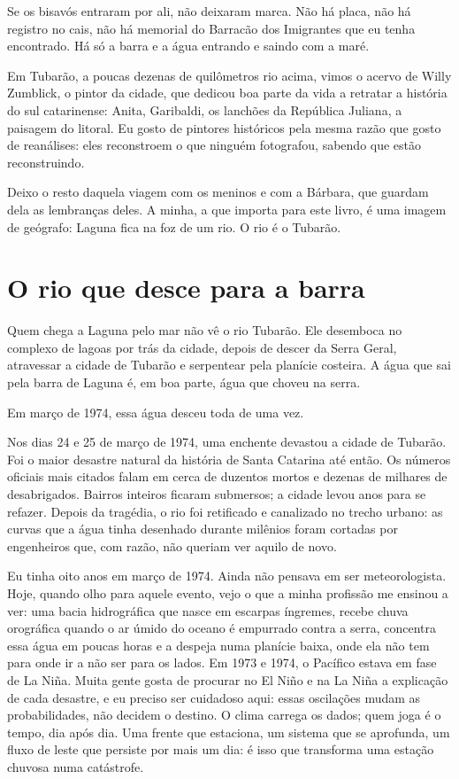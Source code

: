 \documentclass[
  brazilian,
  11pt,
  openany]{book}
\begin{document}
Se os bisavós entraram por ali, não deixaram marca. Não há placa, não há
registro no cais, não há memorial do Barracão dos Imigrantes que eu
tenha encontrado. Há só a barra e a água entrando e saindo com a maré.

Em Tubarão, a poucas dezenas de quilômetros rio acima, vimos o acervo de
Willy Zumblick, o pintor da cidade, que dedicou boa parte da vida a
retratar a história do sul catarinense: Anita, Garibaldi, os lanchões da
República Juliana, a paisagem do litoral. Eu gosto de pintores
históricos pela mesma razão que gosto de reanálises: eles reconstroem o
que ninguém fotografou, sabendo que estão reconstruindo.

Deixo o resto daquela viagem com os meninos e com a Bárbara, que guardam
dela as lembranças deles. A minha, a que importa para este livro, é uma
imagem de geógrafo: Laguna fica na foz de um rio. O rio é o Tubarão.

\section{O rio que desce para a
barra}\label{o-rio-que-desce-para-a-barra}

Quem chega a Laguna pelo mar não vê o rio Tubarão. Ele desemboca no
complexo de lagoas por trás da cidade, depois de descer da Serra Geral,
atravessar a cidade de Tubarão e serpentear pela planície costeira. A
água que sai pela barra de Laguna é, em boa parte, água que choveu na
serra.

Em março de 1974, essa água desceu toda de uma vez.

Nos dias 24 e 25 de março de 1974, uma enchente devastou a cidade de
Tubarão. Foi o maior desastre natural da história de Santa Catarina até
então. Os números oficiais mais citados falam em cerca de duzentos
mortos e dezenas de milhares de desabrigados. Bairros inteiros ficaram
submersos; a cidade levou anos para se refazer. Depois da tragédia, o
rio foi retificado e canalizado no trecho urbano: as curvas que a água
tinha desenhado durante milênios foram cortadas por engenheiros que, com
razão, não queriam ver aquilo de novo.

Eu tinha oito anos em março de 1974. Ainda não pensava em ser
meteorologista. Hoje, quando olho para aquele evento, vejo o que a minha
profissão me ensinou a ver: uma bacia hidrográfica que nasce em escarpas
íngremes, recebe chuva orográfica quando o ar úmido do oceano é
empurrado contra a serra, concentra essa água em poucas horas e a
despeja numa planície baixa, onde ela não tem para onde ir a não ser
para os lados. Em 1973 e 1974, o Pacífico estava em fase de La Niña.
Muita gente gosta de procurar no El Niño e na La Niña a explicação de
cada desastre, e eu preciso ser cuidadoso aqui: essas oscilações mudam
as probabilidades, não decidem o destino. O clima carrega os dados; quem
joga é o tempo, dia após dia. Uma frente que estaciona, um sistema que
se aprofunda, um fluxo de leste que persiste por mais um dia: é isso que
transforma uma estação chuvosa numa catástrofe.
\end{document}
